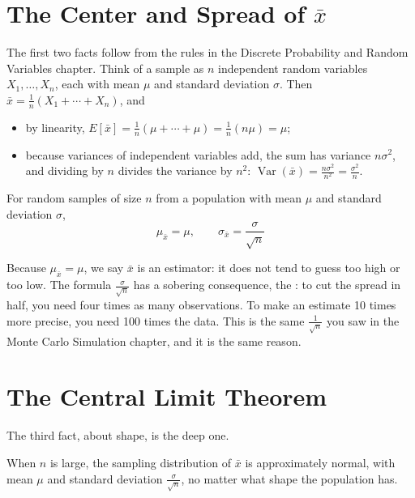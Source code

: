 \section{The Center and Spread of $\bar{x}$}
The first two facts follow from the rules in the Discrete Probability and Random Variables chapter. Think of a
sample as $n$ independent random variables $X_1, \dots, X_n$, each with mean $\mu$ and
standard deviation $\sigma$. Then $\bar{x} = \frac{1}{n}(X_1 + \cdots + X_n)$, and
\begin{itemize}
\item by linearity, $E[\bar{x}] = \frac{1}{n}(\mu + \cdots + \mu) = \frac{1}{n}(n\mu) = \mu$;
\item because variances of independent variables add, the sum has variance $n\sigma^2$,
and dividing by $n$ divides the variance by $n^2$:
$\operatorname{Var}(\bar{x}) = \frac{n\sigma^2}{n^2} = \frac{\sigma^2}{n}$.
\end{itemize}

\begin{mdframed}[style = important, frametitle = {Mean and Standard Deviation of $\bar{x}$}]
For random samples of size $n$ from a population with mean $\mu$ and standard deviation $\sigma$,
$$\mu_{\bar{x}} = \mu, \qquad \sigma_{\bar{x}} = \frac{\sigma}{\sqrt{n}}$$
\end{mdframed}

Because $\mu_{\bar{x}} = \mu$, we say $\bar{x}$ is an  estimator: it does
not tend to guess too high or too low. The formula $\frac{\sigma}{\sqrt{n}}$ has a
sobering consequence, the : to cut the spread in half, you need
four times as many observations. To make an estimate 10 times more precise, you need
100 times the data. This is the same $\frac{1}{\sqrt{n}}$ you saw in the Monte Carlo
Simulation chapter, and it is the same reason.

\section{The Central Limit Theorem}
The third fact, about shape, is the deep one.

\begin{mdframed}[style = important, frametitle = {The Central Limit Theorem}]
When $n$ is large, the sampling distribution of $\bar{x}$ is approximately normal, with
mean $\mu$ and standard deviation $\frac{\sigma}{\sqrt{n}}$, no matter what shape the
population has.
\end{mdframed}

